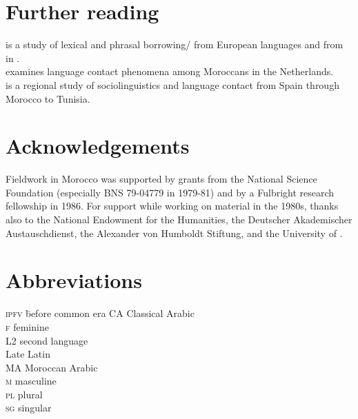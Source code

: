 \documentclass[output=paper]{langsci/langscibook}
\begin{document}
\section*{Further reading}

\citet{Heath1989} is a study of lexical and phrasal borrowing/ from European languages and from   in .\\
\citet{Nortier1990} examines language contact phenomena among Moroccans in the Netherlands.\\
\citet{Sayahi2014} is a regional study of  sociolinguistics and language contact from Spain through Morocco to Tunisia.

\section*{Acknowledgements}

Fieldwork in Morocco was supported by grants from the National Science Foundation (especially BNS 79-04779 in 1979-81) and by a Fulbright research fellowship in 1986. For support while working on  material in the 1980s, thanks also to the National Endowment for the Humanities, the Deutscher Akademischer Austauschdienst, the Alexander von Humboldt Stiftung, and the  University of .


\section*{Abbreviations}
\begin{multicols}{2}
\begin{tabbing}
\textsc{ipfv} \hspace{1em} \= before common era\kill
CA         \> Classical Arabic\\
\textsc{f}  \> feminine\\
L2          \> second language \\
          \> Late Latin\\
MA         \> Moroccan Arabic\\
\textsc{m}  \> masculine\\
\textsc{pl} \> plural\\
\textsc{sg} \> singular
\end{tabbing}
\end{multicols}


{\sloppy\printbibliography[heading=subbibliography,notkeyword=this]}
\end{document}
